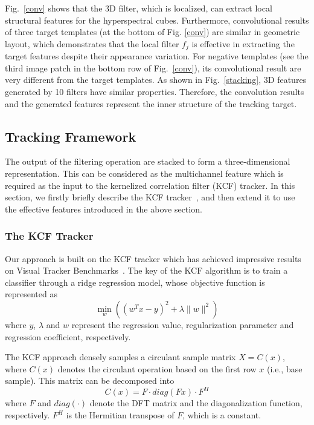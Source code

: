 \documentclass[runningheads,a4paper]{llncs}
\begin{document}
Fig.~\ref{conv} shows that the 3D filter, which is localized, can extract local structural features for the hyperspectral cubes. Furthermore, convolutional results of three target templates (at the bottom of Fig. \ref{conv}) are similar in geometric layout, which demonstrates that the local filter $f_j$ is effective in extracting the target features despite their appearance variation. For negative templates (see the third image patch in the bottom row of Fig.~\ref{conv}), its convolutional result are very different from the target templates. As shown in Fig.~\ref{stacking}, 3D features generated by 10 filters have similar properties. Therefore, the convolution results and the generated features represent the inner structure of the tracking target.

\subsection{Tracking Framework}

The output of the filtering operation are stacked to form a three-dimensional representation. This can be considered as the multichannel feature which is required as the input to the kernelized correlation filter (KCF) tracker. In this section, we firstly briefly describe the KCF tracker~\cite{KCF}, and then extend it to use the effective features introduced in the above section.

\subsubsection{The KCF Tracker}

Our approach is built on the KCF tracker which has achieved impressive results on Visual Tracker Benchmarks~\cite{VOT}. The key of the KCF algorithm is to train a classifier through a ridge regression model, whose objective function is represented as
\begin{equation}\label{2}
\min_{w} ( (w^Tx-y)^2 +\lambda \| w \|^2)
\end{equation}
where  $y$, $\lambda$ and $w$ represent the regression value, regularization parameter and regression coefficient, respectively.

The KCF approach densely samples a circulant sample matrix $X=C(x)$, where $C(x)$ denotes the circulant operation based on the first row $x$ (i.e., base sample). This matrix can be decomposed into
\begin{equation}\label{3}
C(x)=F \cdot diag (Fx) \cdot F^H
\end{equation}
where $F$ and $diag(\cdot)$ denote the DFT matrix and the diagonalization function, respectively. $F^H$ is the Hermitian transpose of $F$, which is a constant.
\end{document}
